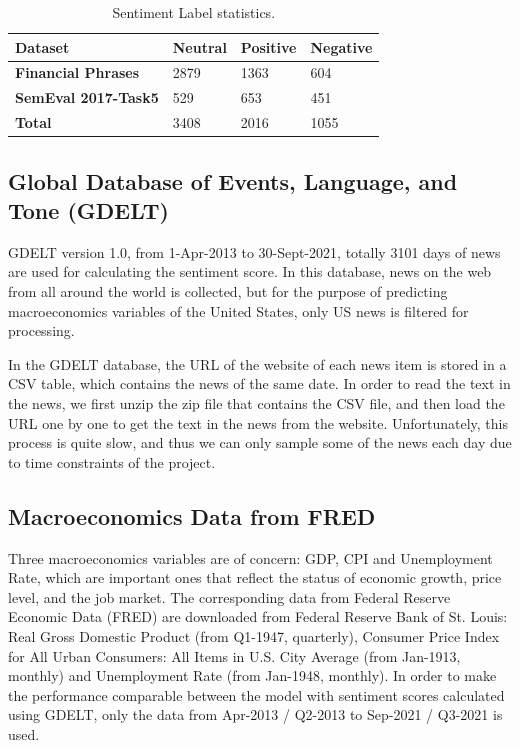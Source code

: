 \documentclass[11pt,a4paper]{article}
\begin{document}
\begin{table}
\begin{center}
\begin{tabular}{|p{2cm} | p{1.4cm} | p{1.4cm} | p{1.4cm} |}
 \hline
 \textbf{Dataset} & \textbf{Neutral} & \textbf{Positive} & \textbf{Negative} \\ [0.5ex] 
 \hline\hline
 \textbf{Financial Phrases} & 2879 & 1363 & 604 \\ 
 \hline
 \textbf{SemEval 2017-Task5} & 529 & 653 & 451 \\
 \hline
 \textbf{Total} & 3408 & 2016 & 1055 \\
 \hline
\end{tabular}
\caption{Sentiment Label statistics.}
\label{tab:1}
\end{center}
\end{table}

\subsection{Global Database of Events, Language, and Tone (GDELT)}

GDELT version 1.0, from 1-Apr-2013 to 30-Sept-2021, totally 3101 days of news are used for calculating the sentiment score. In this database, news on the web from all around the world is collected, but for the purpose of predicting macroeconomics variables of the United States, only US news is filtered for processing.

In the GDELT database, the URL of the website of each news item is stored in a CSV table, which contains the news of the same date. In order to read the text in the news, we first unzip the zip file that contains the CSV file, and then load the URL one by one to get the text in the news from the website. Unfortunately, this process is quite slow, and thus we can only sample some of the news each day due to time constraints of the project.
	

\subsection{Macroeconomics Data from FRED}

Three macroeconomics variables are of concern: GDP, CPI and Unemployment Rate, which are important ones that reflect the status of economic growth, price level, and the job market. The corresponding data from Federal Reserve Economic Data (FRED) are downloaded from Federal Reserve Bank of St. Louis: Real Gross Domestic Product (from Q1-1947, quarterly), Consumer Price Index for All Urban Consumers: All Items in U.S. City Average (from Jan-1913, monthly) and Unemployment Rate (from Jan-1948, monthly). In order to make the performance comparable between the model with sentiment scores calculated using GDELT, only the data from Apr-2013 / Q2-2013 to Sep-2021 / Q3-2021 is used.
\end{document}
